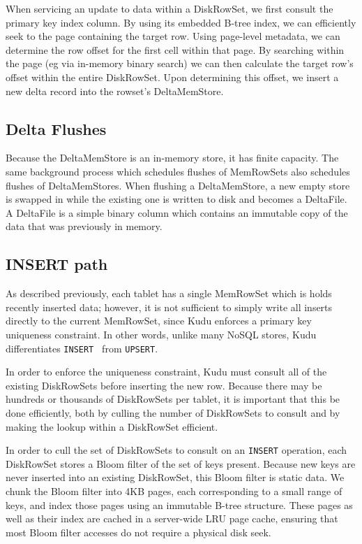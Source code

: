 \documentclass{vldb}
\begin{document}
When servicing an update to data within a DiskRowSet, we first consult the primary key index column.
By using its embedded B-tree index, we can efficiently seek to the page containing the target
row. Using page-level metadata, we can determine the row offset for the first cell within that
page. By searching within the page (eg via in-memory binary search) we can then calculate the
target row's offset within the entire DiskRowSet. Upon determining this offset, we insert a new
delta record into the rowset's DeltaMemStore.

\subsection{Delta Flushes}

Because the DeltaMemStore is an in-memory store, it has finite capacity. The same background
process which schedules flushes of MemRowSets also schedules flushes of DeltaMemStores.
When flushing a DeltaMemStore, a new empty store is swapped in while the existing one
is written to disk and becomes a DeltaFile. A DeltaFile is a simple binary column
which contains an immutable copy of the data that was previously in memory.

\subsection{INSERT path}

As described previously, each tablet has a single MemRowSet which is holds
recently inserted data; however, it is not sufficient to simply write all inserts directly
to the current MemRowSet, since Kudu enforces a primary key uniqueness constraint. In other
words, unlike many NoSQL stores, Kudu differentiates {\tt INSERT } from {\tt UPSERT}.

In order to enforce the uniqueness constraint, Kudu must consult all of the existing DiskRowSets
before inserting the new row. Because there may be hundreds or thousands of DiskRowSets per
tablet, it is important that this be done efficiently, both by culling the number of DiskRowSets
to consult and by making the lookup within a DiskRowSet efficient.

In order to cull the set of DiskRowSets to consult on an {\tt INSERT} operation, each DiskRowSet
stores a Bloom filter of the set of keys present. Because new keys are
never inserted into an existing DiskRowSet, this Bloom filter is static data. We chunk the Bloom
filter into 4KB pages, each corresponding to a small range of keys, and index those pages using
an immutable B-tree structure. These pages as well as their index are cached in a server-wide
LRU page cache, ensuring that most Bloom filter accesses do not require a physical disk seek.
\end{document}
